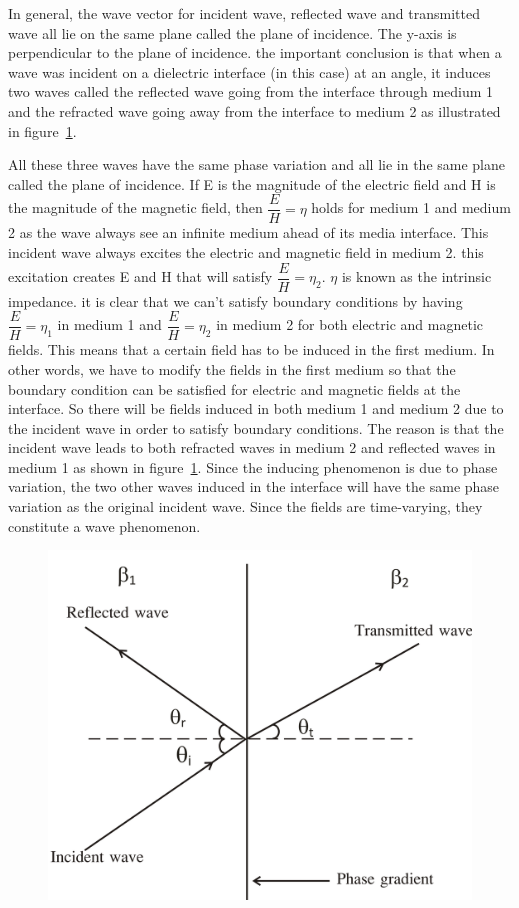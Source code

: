 In general, the wave vector for incident wave, reflected wave and transmitted wave all lie on the same plane called the plane of incidence. The y-axis is perpendicular to the plane of incidence. the important conclusion is that when a wave was incident on a dielectric interface (in this case) at an angle, it induces two waves called the reflected wave going from the interface through medium 1  and the refracted wave going away from the interface to medium 2 as illustrated in figure~\ref{fig:group30e}.

All these three waves have the same phase variation and all lie in the same plane called the plane of incidence. If E is the magnitude of the electric field and H is the magnitude of the magnetic field, then $\dfrac{E}{H}=\eta$ holds for medium 1 and medium 2 as the wave always see an infinite medium ahead of its media interface. This incident wave always excites the electric and magnetic field in medium 2. this excitation creates E and H that will satisfy $\dfrac{E}{H}=\eta_2$. $\eta$ is known as the intrinsic impedance. it is clear that we can't satisfy boundary conditions by having $\dfrac{E}{H}=\eta_1$ in medium 1 and $\dfrac{E}{H}=\eta_2$ in medium 2 for both electric and magnetic fields. This means that a certain field has to be induced in the first medium. In other words, we have to modify the fields in the first medium so that the boundary condition can be satisfied for electric and magnetic fields at the interface. So there will be fields induced in both medium 1 and medium 2 due to the incident wave in order to satisfy boundary conditions. The reason is that the incident wave leads to both refracted waves in medium 2 and reflected waves in medium 1 as shown in figure~\ref{fig:group30e}. Since the inducing phenomenon is due to phase variation, the two other waves induced in the interface will have the same phase variation as the original incident wave. Since the fields are time-varying, they constitute a wave phenomenon.
\begin{figure}[h]
\centering
\includegraphics[width=.7\linewidth]{./graphics/group30e}
\caption{}
\label{fig:group30e}
\end{figure}

